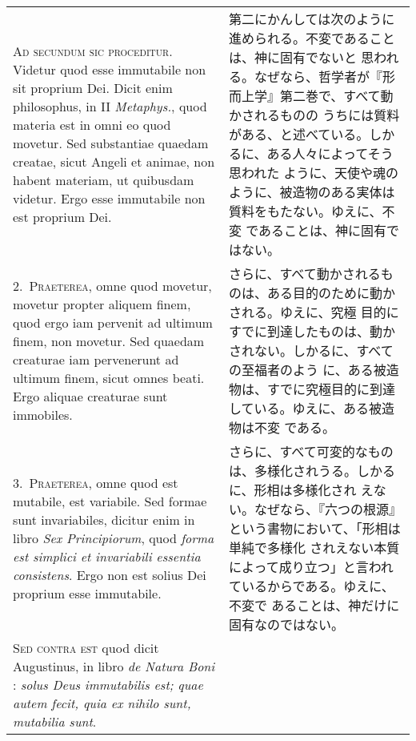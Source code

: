 \documentclass[10pt]{jsarticle} %
\begin{document}
\begin{longtable}{p{21em}p{21em}}

{\huge A}{\scshape d secundum sic proceditur}. Videtur quod esse
immutabile non sit proprium Dei. Dicit enim philosophus, in II {\it
Metaphys.}, quod materia est in omni eo quod movetur. Sed substantiae
quaedam creatae, sicut Angeli et animae, non habent materiam, ut
quibusdam videtur. Ergo esse immutabile non est proprium Dei.


&

第二にかんしては次のように進められる。不変であることは、神に固有でないと
思われる。なぜなら、哲学者が『形而上学』第二巻で、すべて動かされるものの
うちには質料がある、と述べている。しかるに、ある人々によってそう思われた
ように、天使や魂のように、被造物のある実体は質料をもたない。ゆえに、不変
であることは、神に固有ではない。

\\

2.~{\scshape Praeterea}, omne quod movetur, movetur propter aliquem
   finem, quod ergo iam pervenit ad ultimum finem, non
   movetur. Sed quaedam creaturae iam pervenerunt ad ultimum
   finem, sicut omnes beati. Ergo aliquae creaturae sunt
   immobiles.

&

さらに、すべて動かされるものは、ある目的のために動かされる。ゆえに、究極
目的にすでに到達したものは、動かされない。しかるに、すべての至福者のよう
に、ある被造物は、すでに究極目的に到達している。ゆえに、ある被造物は不変
である。

\\


3.~{\scshape Praeterea}, omne quod est mutabile, est variabile. Sed
formae sunt invariabiles, dicitur enim in libro {\it Sex Principiorum},
quod {\itshape forma est simplici et invariabili essentia
consistens}. Ergo non est solius Dei proprium esse immutabile.  


&

さらに、すべて可変的なものは、多様化されうる。しかるに、形相は多様化され
えない。なぜなら、『六つの根源』という書物において、「形相は単純で多様化
されえない本質によって成り立つ」と言われているからである。ゆえに、不変で
あることは、神だけに固有なのではない。

\\


{\scshape Sed contra est} quod dicit Augustinus, in libro {\it de Natura
Boni} : {\itshape solus Deus immutabilis est; quae autem fecit, quia ex
nihilo sunt, mutabilia sunt}.


\end{longtable}
\end{document}
